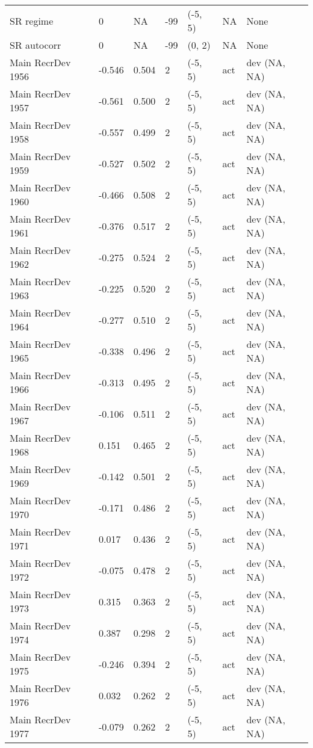 \documentclass[11pt,
  english,
  letterpaper,
]{article}
\begin{document}
\begin{landscape}
\begin{longtable}[t]{>{\raggedright\arraybackslash}p{7.5cm}lllll>{\raggedright\arraybackslash}p{3.5cm}}
SR regime & 0 & NA & -99 & (-5, 5) & NA & None\\
SR autocorr & 0 & NA & -99 & (0, 2) & NA & None\\
Main RecrDev 1956 & -0.546 & 0.504 & 2 & (-5, 5) & act & dev (NA, NA)\\
Main RecrDev 1957 & -0.561 & 0.500 & 2 & (-5, 5) & act & dev (NA, NA)\\
Main RecrDev 1958 & -0.557 & 0.499 & 2 & (-5, 5) & act & dev (NA, NA)\\
Main RecrDev 1959 & -0.527 & 0.502 & 2 & (-5, 5) & act & dev (NA, NA)\\
Main RecrDev 1960 & -0.466 & 0.508 & 2 & (-5, 5) & act & dev (NA, NA)\\
Main RecrDev 1961 & -0.376 & 0.517 & 2 & (-5, 5) & act & dev (NA, NA)\\
Main RecrDev 1962 & -0.275 & 0.524 & 2 & (-5, 5) & act & dev (NA, NA)\\
Main RecrDev 1963 & -0.225 & 0.520 & 2 & (-5, 5) & act & dev (NA, NA)\\
Main RecrDev 1964 & -0.277 & 0.510 & 2 & (-5, 5) & act & dev (NA, NA)\\
Main RecrDev 1965 & -0.338 & 0.496 & 2 & (-5, 5) & act & dev (NA, NA)\\
Main RecrDev 1966 & -0.313 & 0.495 & 2 & (-5, 5) & act & dev (NA, NA)\\
Main RecrDev 1967 & -0.106 & 0.511 & 2 & (-5, 5) & act & dev (NA, NA)\\
Main RecrDev 1968 & 0.151 & 0.465 & 2 & (-5, 5) & act & dev (NA, NA)\\
Main RecrDev 1969 & -0.142 & 0.501 & 2 & (-5, 5) & act & dev (NA, NA)\\
Main RecrDev 1970 & -0.171 & 0.486 & 2 & (-5, 5) & act & dev (NA, NA)\\
Main RecrDev 1971 & 0.017 & 0.436 & 2 & (-5, 5) & act & dev (NA, NA)\\
Main RecrDev 1972 & -0.075 & 0.478 & 2 & (-5, 5) & act & dev (NA, NA)\\
Main RecrDev 1973 & 0.315 & 0.363 & 2 & (-5, 5) & act & dev (NA, NA)\\
Main RecrDev 1974 & 0.387 & 0.298 & 2 & (-5, 5) & act & dev (NA, NA)\\
Main RecrDev 1975 & -0.246 & 0.394 & 2 & (-5, 5) & act & dev (NA, NA)\\
Main RecrDev 1976 & 0.032 & 0.262 & 2 & (-5, 5) & act & dev (NA, NA)\\
Main RecrDev 1977 & -0.079 & 0.262 & 2 & (-5, 5) & act & dev (NA, NA)\\

\end{longtable}
\end{landscape}
\end{document}

